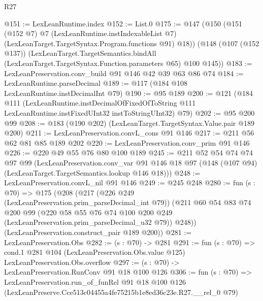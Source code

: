 \begin{lexlean}{R27}
\begin{coremodule}
@151 := LexLeanRuntime.index
@152 := List.{0}
@175 := @147
    (@150
      (@151
        (@152 @7)
        @7
        (LexLeanRuntime.instIndexableList @7)
        (LexLeanTarget.TargetSyntax.Program.functions @91)
        @18))
    (@148
      (@107 (@152 @137))
      (LexLeanTarget.TargetSemantics.bindAll
        (LexLeanTarget.TargetSyntax.Function.parameters @65)
        @100
        @145))
@183 := LexLeanPreservation.conv_build @91 @146 @42 @39 @63 @86 @74
@184 := LexLeanRuntime.parseDecimal
@189 := @117 (@184 @108 LexLeanRuntime.instDecimalInt @79)
@190 := @95 @189
@200 := @121
    (@184
      @111
      (LexLeanRuntime.instDecimalOfFixedOfToString
        @111
        LexLeanRuntime.instFixedUInt32
        instToStringUInt32)
      @79)
@202 := @95 @200 @99
@208 := @183 (@190 @202) (LexLeanTarget.TargetSyntax.Value.pair @189 @200)
@211 := LexLeanPreservation.convL_cons @91 @146
@217 := @211 @56 @62 @81 @85 @189 @202
@220 := LexLeanPreservation.conv_prim @91 @146
@226 := @220 @49 @55 @76 @80 @100 @189
@245 := @211
    @52
    @54
    @74
    @74
    @97
    @99
    (LexLeanPreservation.conv_var
      @91
      @146
      @18
      @97
      (@148 (@107 @94) (LexLeanTarget.TargetSemantics.lookup @146 @18)))
@248 := LexLeanPreservation.convL_nil @91 @146
@249 := @245 @248
@280 := fun (s : @70) =>
  @175
    (@208
      (@217
        (@226 @249 (LexLeanPreservation.prim_parseDecimal_int @79))
        (@211
          @60
          @54
          @83
          @74
          @200
          @99
          (@220 @58 @55 @76 @74 @100 @200 @249 (LexLeanPreservation.prim_parseDecimal_u32 @79))
          @248))
      (LexLeanPreservation.construct_pair @189 @200))
@281 := LexLeanPreservation.Obs
@282 := (s : @70) -> @281
@291 := fun (s : @70) =>
  cond.{1} @281 @104 (LexLeanPreservation.Obs.value @125) LexLeanPreservation.Obs.overflow
@297 := (s : @70) -> LexLeanPreservation.RunConv @91 @18 @100 @126
@306 := fun (s : @70) =>
  LexLeanPreservation.run_of_funRel
    @91
    @18
    @100
    @126
    (LexLeanPreserve.Cce513c04455a4fe75215b1e8ed36c23e.R27.__rel_0 @79)
\end{coremodule}
\end{lexlean}
